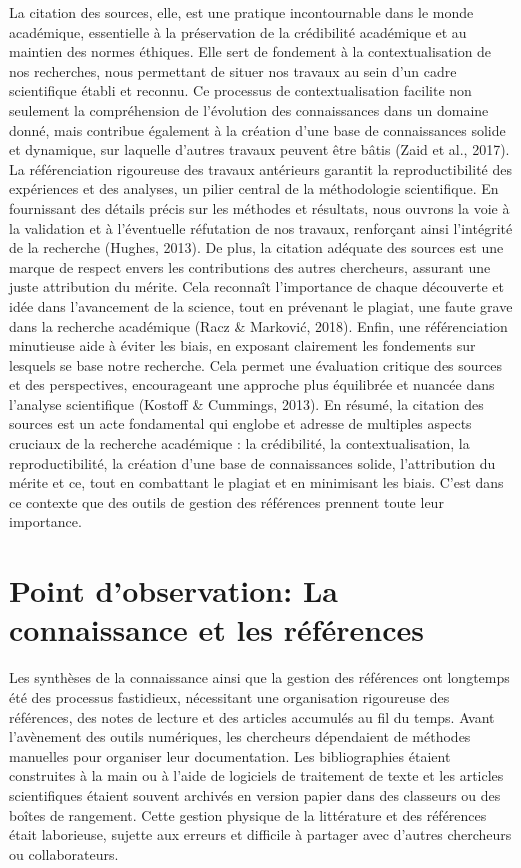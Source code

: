 \documentclass[
  letterpaper,
  DIV=11,
  numbers=noendperiod]{scrreprt}
\begin{document}
La citation des sources, elle, est une pratique incontournable dans le
monde académique, essentielle à la préservation de la crédibilité
académique et au maintien des normes éthiques. Elle sert de fondement à
la contextualisation de nos recherches, nous permettant de situer nos
travaux au sein d'un cadre scientifique établi et reconnu. Ce processus
de contextualisation facilite non seulement la compréhension de
l'évolution des connaissances dans un domaine donné, mais contribue
également à la création d'une base de connaissances solide et dynamique,
sur laquelle d'autres travaux peuvent être bâtis (Zaid et al., 2017). La
référenciation rigoureuse des travaux antérieurs garantit la
reproductibilité des expériences et des analyses, un pilier central de
la méthodologie scientifique. En fournissant des détails précis sur les
méthodes et résultats, nous ouvrons la voie à la validation et à
l'éventuelle réfutation de nos travaux, renforçant ainsi l'intégrité de
la recherche (Hughes, 2013). De plus, la citation adéquate des sources
est une marque de respect envers les contributions des autres
chercheurs, assurant une juste attribution du mérite. Cela reconnaît
l'importance de chaque découverte et idée dans l'avancement de la
science, tout en prévenant le plagiat, une faute grave dans la recherche
académique (Racz \& Marković, 2018). Enfin, une référenciation
minutieuse aide à éviter les biais, en exposant clairement les
fondements sur lesquels se base notre recherche. Cela permet une
évaluation critique des sources et des perspectives, encourageant une
approche plus équilibrée et nuancée dans l'analyse scientifique (Kostoff
\& Cummings, 2013). En résumé, la citation des sources est un acte
fondamental qui englobe et adresse de multiples aspects cruciaux de la
recherche académique : la crédibilité, la contextualisation, la
reproductibilité, la création d'une base de connaissances solide,
l'attribution du mérite et ce, tout en combattant le plagiat et en
minimisant les biais. C'est dans ce contexte que des outils de gestion
des références prennent toute leur importance.

\hypertarget{point-dobservation-la-connaissance-et-les-ruxe9fuxe9rences}{%
\section{Point d'observation: La connaissance et les
références}\label{point-dobservation-la-connaissance-et-les-ruxe9fuxe9rences}}

Les synthèses de la connaissance ainsi que la gestion des références ont
longtemps été des processus fastidieux, nécessitant une organisation
rigoureuse des références, des notes de lecture et des articles
accumulés au fil du temps. Avant l'avènement des outils numériques, les
chercheurs dépendaient de méthodes manuelles pour organiser leur
documentation. Les bibliographies étaient construites à la main ou à
l'aide de logiciels de traitement de texte et les articles scientifiques
étaient souvent archivés en version papier dans des classeurs ou des
boîtes de rangement. Cette gestion physique de la littérature et des
références était laborieuse, sujette aux erreurs et difficile à partager
avec d'autres chercheurs ou collaborateurs.
\end{document}
